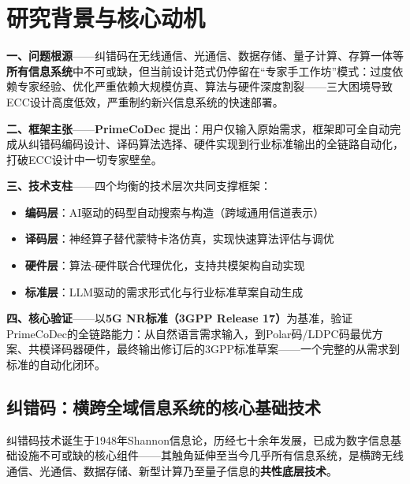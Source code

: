 ﻿\section{研究背景与核心动机}\label{sec:background}

\begin{tcolorbox}[hypothesisstyle,
  title={\normalsize\bfseries\color{natgreen}PrimeCoDec 故事脉络 \quad {\normalfont\itshape Story Narrative}}]
\textbf{一、问题根源}——纠错码在无线通信、光通信、数据存储、量子计算、存算一体等\textbf{所有信息系统}中不可或缺，但当前设计范式仍停留在``专家手工作坊''模式：过度依赖专家经验、优化严重依赖大规模仿真、算法与硬件深度割裂——三大困境导致ECC设计高度低效，严重制约新兴信息系统的快速部署。

\vspace{6pt}
\textbf{二、框架主张}——\textbf{PrimeCoDec} 提出：用户仅输入原始需求，框架即可全自动完成从纠错码编码设计、译码算法选择、硬件实现到行业标准输出的全链路自动化，打破ECC设计中一切专家壁垒。

\vspace{6pt}
\textbf{三、技术支柱}——四个均衡的技术层次共同支撑框架：
\begin{itemize}[nosep]
  \item \textbf{编码层}：AI驱动的码型自动搜索与构造（跨域通用信道表示）
  \item \textbf{译码层}：神经算子替代蒙特卡洛仿真，实现快速算法评估与调优
  \item \textbf{硬件层}：算法-硬件联合代理优化，支持共模架构自动实现
  \item \textbf{标准层}：LLM驱动的需求形式化与行业标准草案自动生成
\end{itemize}

\vspace{6pt}
\textbf{四、核心验证}——以\textbf{5G NR标准（3GPP Release 17）}为基准，验证PrimeCoDec的全链路能力：从自然语言需求输入，到Polar码/LDPC码最优方案、共模译码器硬件，最终输出修订后的3GPP标准草案——一个完整的从需求到标准的自动化闭环。
\end{tcolorbox}

\vspace{8pt}
\subsection{纠错码：横跨全域信息系统的核心基础技术}

纠错码技术诞生于1948年Shannon信息论，历经七十余年发展，已成为数字信息基础设施不可或缺的核心组件——其触角延伸至当今几乎所有信息系统，是横跨无线通信、光通信、数据存储、新型计算乃至量子信息的\textbf{共性底层技术}。

